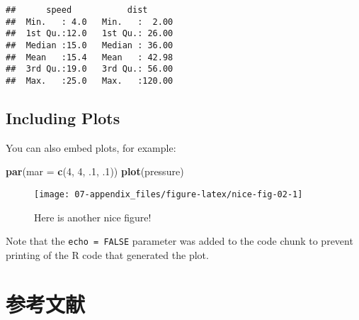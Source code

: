 \documentclass[
  lang=cn,
  11pt,
  scheme=chinese,
  chinesefont=nofont,
  bibstyle=apalike]{elegantbook}
\newenvironment{Shaded}{\begin{snugshade}}{\end{snugshade}}
\newcommand{\DataTypeTok}[1]{\textcolor[rgb]{0.13,0.29,0.53}{#1}}
\newcommand{\DecValTok}[1]{\textcolor[rgb]{0.00,0.00,0.81}{#1}}
\newcommand{\FloatTok}[1]{\textcolor[rgb]{0.00,0.00,0.81}{#1}}
\newcommand{\KeywordTok}[1]{\textcolor[rgb]{0.13,0.29,0.53}{\textbf{#1}}}
\newcommand{\NormalTok}[1]{#1}
\begin{document}
\begin{verbatim}
##      speed           dist       
##  Min.   : 4.0   Min.   :  2.00  
##  1st Qu.:12.0   1st Qu.: 26.00  
##  Median :15.0   Median : 36.00  
##  Mean   :15.4   Mean   : 42.98  
##  3rd Qu.:19.0   3rd Qu.: 56.00  
##  Max.   :25.0   Max.   :120.00
\end{verbatim}

\hypertarget{including-plots}{%
\section{Including Plots}\label{including-plots}}

You can also embed plots, for example:

\begin{Shaded}
\begin{Highlighting}[]
\KeywordTok{par}\NormalTok{(}\DataTypeTok{mar =} \KeywordTok{c}\NormalTok{(}\DecValTok{4}\NormalTok{, }\DecValTok{4}\NormalTok{, }\FloatTok{.1}\NormalTok{, }\FloatTok{.1}\NormalTok{))}
\KeywordTok{plot}\NormalTok{(pressure)}
\end{Highlighting}
\end{Shaded}

\begin{figure}

{\centering \texttt{[image: 07-appendix\_files/figure-latex/nice-fig-02-1]} 

}

\caption{Here is another nice figure!}\label{fig:nice-fig-02}
\end{figure}

Note that the \texttt{echo\ =\ FALSE} parameter was added to the code chunk to prevent printing of the R code that generated the plot.

\hypertarget{References}{%
\chapter*{参考文献}\label{References}}
\end{document}
